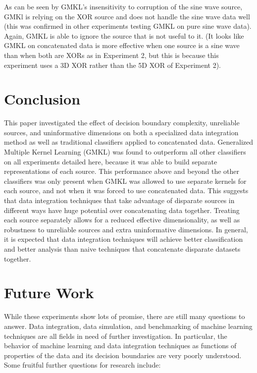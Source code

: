 \documentclass{article}
\begin{document}
As can be seen by GMKL's insensitivity to corruption of the sine wave source,
GMKl is relying on the XOR source and does not handle the sine wave data well
(this was confirmed in other experiments testing GMKL on pure sine wave data).
Again, GMKL is able to ignore the source that is not useful to it. (It looks
like GMKL on concatenated data is more effective when one source is a sine wave
than when both are XORs as in Experiment 2, but this is because this experiment
uses a 3D XOR rather than the 5D XOR of Experiment 2).


\section*{Conclusion}

This paper investigated the effect of decision boundary complexity, unreliable
sources, and uninformative dimensions on both a specialized data integration
method as well as traditional classifiers applied to concatenated data.
Generalized Multiple Kernel Learning (GMKL) was found to outperform all other
classifiers on all experiments detailed here, because it was able to build
separate representations of each source. This performance above and beyond the
other classifiers was only present when GMKL was allowed to use separate
kernels for each source, and not when it was forced to use concatenated data.
This suggests that data integration techniques that take advantage of disparate
sources in different ways have huge potential over concatenating data together.
Treating each source separately allows for a reduced effective dimensionality,
as well as robustness to unreliable sources and extra uninformative dimensions.
In general, it is expected that data integration techniques will achieve better
classification and better analysis than naive techniques that concatenate
disparate datasets together.



\section*{Future Work}
While these experiments show lots of promise, there are still many questions to
answer.  Data integration, data simulation, and benchmarking of machine
learning techniques are all fields in need of further investigation. In
particular, the behavior of machine learning and data integration techniques as
functions of properties of the data and its decision boundaries are very poorly
understood. Some fruitful further questions for research include:
\end{document}
